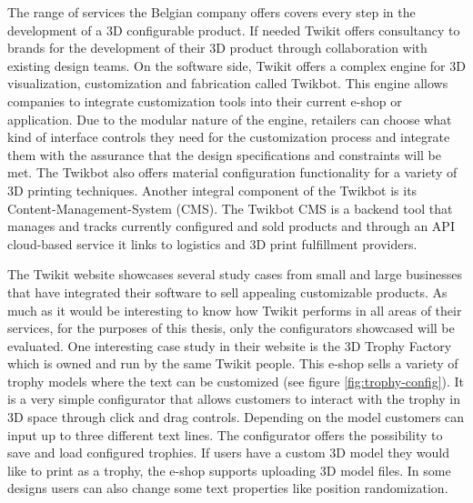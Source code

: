 \documentclass[../medieninformatik-arbeit.tex]{subfiles}
\begin{document}
The range of services the Belgian company offers covers every step in the development of a 3D configurable product. If needed Twikit offers consultancy to brands for the development of their 3D product through collaboration with existing design teams. On the software side, Twikit offers a complex engine for 3D visualization, customization and fabrication called Twikbot. This engine allows companies to integrate customization tools into their current e-shop or application. Due to the modular nature of the engine, retailers can choose what kind of interface controls they need for the customization process and integrate them with the assurance that the design specifications and constraints will be met. The Twikbot also offers material configuration functionality for a variety of 3D printing techniques. Another integral component of the Twikbot is its Content-Management-System (CMS). The Twikbot CMS is a backend tool that manages and tracks currently configured and sold products and through an API cloud-based service it links to logistics and 3D print fulfillment providers. 

The Twikit website showcases several study cases from small and large businesses that have integrated their software to sell appealing customizable products. As much as it would be interesting to know how Twikit performs in all areas of their services, for the purposes of this thesis, only the configurators showcased will be evaluated. One interesting case study in their website is the 3D Trophy Factory \cite{twikit2015tech} which is owned and run by the same Twikit people. This e-shop sells a variety of trophy models where the text can be customized (see figure \ref{fig:trophy-config}). It is a very simple configurator that allows customers to interact with the trophy in 3D space through click and drag controls. Depending on the model customers can input up to three different text lines. The configurator offers the possibility to save and load configured trophies. If users have a custom 3D model they would like to print as a trophy, the e-shop supports uploading 3D model files. In some designs users can also change some text properties like position randomization. 
\end{document}
